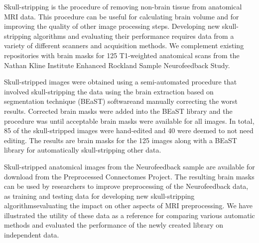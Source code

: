 Skull-stripping is the procedure of removing non-brain tissue from anatomical MRI data. This procedure can be useful for calculating brain volume and for improving the quality of other image processing steps. Developing new skull-stripping algorithms and evaluating their performance requires \DIFdelbegin {}\DIFdelend \DIFaddbegin {}\DIFaddend data from a variety of different scanners and acquisition methods. We complement existing repositories with \DIFdelbegin {}\DIFdelend \DIFaddbegin {}\DIFaddend brain masks for 125 T1-weighted anatomical scans from the Nathan Kline Institute Enhanced Rockland Sample Neurofeedback Study.

Skull-stripped images were obtained using a semi-automated procedure that involved skull-stripping the data using the brain extraction based on \DIFdelbegin {}\DIFdelend \DIFaddbegin {}\DIFaddend segmentation technique (BEaST) software\DIFaddbegin \DIFadd{, }\DIFaddend and manually correcting the worst results. Corrected brain masks were added into the BEaST library and the procedure was \DIFdelbegin {}\DIFdelend \DIFaddbegin {}\DIFaddend until acceptable brain masks were available for all images. In total, 85 of the skull-stripped images were hand-edited and 40 were deemed to not need editing. The results are brain masks for the 125 images along with a BEaST library for automatically skull-stripping other data.


Skull-stripped anatomical images from the Neurofeedback sample are available for download from the Preprocessed Connectomes Project. The resulting brain masks can be used by researchers to improve \DIFdelbegin {}\DIFdelend preprocessing of the Neurofeedback data, \DIFdelbegin {}\DIFdelend as training and testing data for developing new skull-stripping algorithms\DIFdelbegin {}\DIFdelend \DIFaddbegin {}\DIFaddend evaluating the impact on other aspects of MRI preprocessing. We have illustrated the utility of these data as a reference for comparing various automatic methods and evaluated the performance of the newly created library on independent data.
